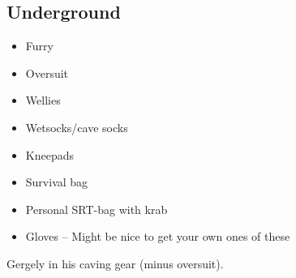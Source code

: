 \subsection{Underground}
\begin{itemize}
    \item Furry
    \item Oversuit
    \item Wellies
    \item Wetsocks/cave socks
    \item Kneepads
    \item Survival bag
    \item Personal SRT-bag with krab
    \item Gloves – Might be nice to get your own ones of these
\end{itemize}


\begin{marginfigure}
\checkoddpage \ifoddpage \forcerectofloat \else \forceversofloat \fi
\centering
 \caption{Gergely in his caving gear (minus oversuit). }
 \label{caving equipment}
\end{marginfigure}

